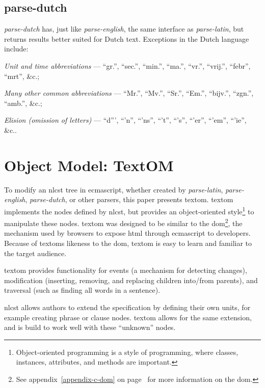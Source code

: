 \subsection{parse-dutch}\label{parse-dutch}

\emph{parse-dutch} has, just like \emph{parse-english}, the same interface as
\emph{parse-latin}, but returns results better suited for Dutch text.
Exceptions in the Dutch language include:

\begin{aenumerate}
\item\emph{Unit and time abbreviations} --- ``gr.'', ``sec.'', ``min.'', ``ma.'',
  ``vr.'', ``vrij.'', ``febr'', ``mrt'', \&c.;
\item\emph{Many other common abbreviations} --- ``Mr.'', ``Mv.'', ``Sr.'',
  ``Em.'', ``bijv.'', ``zgn.'', ``amb.'', \&c.;
\item\emph{Elision (omission of letters)} --- ``d''', ``'n'', ``'ns'',
  ``'t'', ``'s'', ``'er'', ``'em'', ``'ie'', \&c..
\end{aenumerate}

\section{Object Model: TextOM}\label{object-model}

To modify an \gls{nlcst} tree in \gls{ecmascript}, whether created by
  \emph{parse-latin}, \emph{parse-english}, \emph{parse-dutch}, or other
  parsers, this paper presents \gls{textom}.
\gls{textom} implements the nodes defined by \gls{nlcst},
  but provides an object-oriented style\footnote{Object-oriented
    programming is a style of programming, where classes, instances,
    attributes, and methods are important.} to manipulate these nodes.
\gls{textom} was designed to be similar to the \gls{dom}\footnote{See
    appendix~\ref{appendix-c-dom} on page~\pageref{appendix-c-dom} for more
    information on the \gls{dom}.},
  the mechanism used by browsers to expose \gls{html} through
  \gls{ecmascript} to developers.
Because of \glspl{textom} likeness to the \gls{dom}, \gls{textom} is
  easy to learn and familiar to the target audience.

\gls{textom} provides functionality for events (a mechanism for detecting
  changes), modification (inserting, removing, and replacing children
  into\slash from parents), and traversal (such as finding all words in a
  sentence).

\gls{nlcst} allows authors to extend the specification by defining their
  own units, for example creating phrase or clause nodes.
\gls{textom} allows for the same extension, and is build to work well
  with these ``unknown'' nodes.

